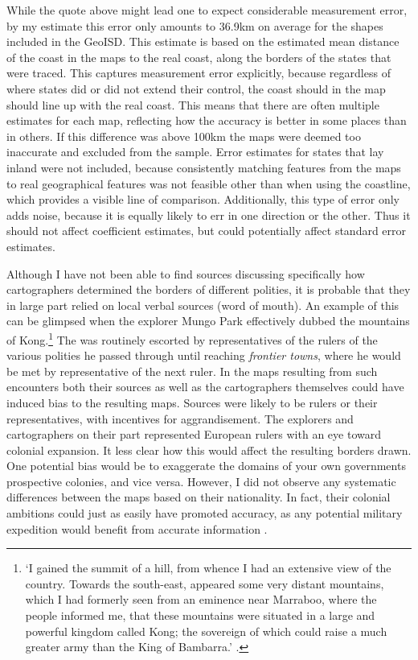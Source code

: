 \documentclass[12pt]{article}
\begin{document}
While the quote above might lead one to expect considerable measurement error,
by my estimate this error only amounts to 36.9km on average for the shapes
included in the GeoISD. This estimate is based on the estimated mean distance of
the coast in the maps to the real coast, along the borders of the states that
were traced. This captures measurement error explicitly, because regardless of
where states did or did not extend their control, the coast should in the map
should line up with the real coast. This means that there are often multiple
estimates for each map, reflecting how the accuracy is better in some places
than in others. If this difference was above 100km the maps were deemed too
inaccurate and excluded from the sample. Error estimates for states that lay
inland were not included, because consistently matching features from the maps
to real geographical features was not feasible other than when using the
coastline, which provides a visible line of comparison. Additionally, this type
of error only adds noise, because it is equally likely to err in one direction
or the other. Thus it should not affect coefficient estimates, but could
potentially affect standard error estimates.

Although I have not been able to find sources discussing specifically how
cartographers determined the borders of different polities, it is probable that
they in large part relied on local verbal sources (word of mouth). An example of
this can be glimpsed when the explorer Mungo Park effectively dubbed the
mountains of Kong.\footnote{`I gained the summit of a hill, from whence I had an
	extensive view of the country. Towards the south-east, appeared some
	very distant mountains, which I had formerly seen from an eminence near
	Marraboo, where the people informed me, that these mountains were
	situated in a large and powerful kingdom called Kong; the sovereign of
	which could raise a much greater army than the King of Bambarra.'
\citep[CHAPTER XVIII]{ParkMungo2015Titi}.} The \citet{ParkMungo2015Titi} was
routinely escorted by representatives of the rulers of the various polities he
passed through until reaching \textit{frontier towns}, where he would be met by
representative of the next ruler. In the maps resulting from such encounters
both their sources as well as the cartographers themselves could have induced
bias to the resulting maps. Sources were likely to be rulers or their
representatives, with incentives for aggrandisement. The explorers and
cartographers on their part represented European rulers with an eye toward
colonial expansion. It less clear how this would affect the resulting borders
drawn. One potential bias would be to exaggerate the domains of your own
governments prospective colonies, and vice versa. However, I did not observe any
systematic differences between the maps based on their nationality. In fact,
their colonial ambitions could just as easily have promoted accuracy, as any
potential military expedition would benefit from accurate information
\citep{Bassett_1994}.
\end{document}
